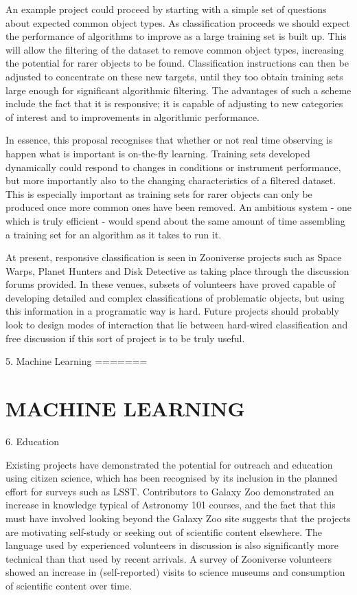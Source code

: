 \documentclass{pasa}
\begin{document}
An example project could proceed by starting with a simple set of questions about expected common object types. As classification proceeds we should expect the performance of algorithms to improve as a large training set is built up. This will allow the filtering of the dataset to remove common object types, increasing the potential for rarer objects to be found. Classification instructions can then be adjusted to concentrate on these new targets, until they too obtain training sets large enough for significant algorithmic filtering. The advantages of such a scheme include the fact that it is responsive; it is capable of adjusting to new categories of interest and to improvements in algorithmic performance. 

In essence, this proposal recognises that whether or not real time observing is happen what is important is on-the-fly learning. Training sets developed dynamically could respond to changes in conditions or instrument performance, but more importantly also to the changing characteristics of a filtered dataset. This is especially important as training sets for rarer objects can only be produced once more common ones have been removed. An ambitious system - one which is truly efficient - would spend about the same amount of time assembling a training set for an algorithm as it takes to run it. 

At present, responsive classification is seen in Zooniverse projects such as Space Warps, Planet Hunters and Disk Detective as taking place through the discussion forums provided. In these venues, subsets of volunteers have proved capable of developing detailed and complex classifications of problematic objects, but using this information in a programatic way is hard. Future projects should probably look to design modes of interaction that lie between hard-wired classification and free discussion if this sort of project is to be truly useful. 


5. Machine Learning
=======
\section{MACHINE LEARNING}
\label{sec:ml}

6. Education

Existing projects have demonstrated the potential for outreach and education using citizen science, which has been recognised by its inclusion in the planned effort for surveys such as LSST. Contributors to Galaxy Zoo demonstrated an increase in knowledge typical of Astronomy 101 courses, and the fact that this must have involved looking beyond the Galaxy Zoo site suggests that the projects are motivating self-study or seeking out of scientific content elsewhere. The language used by experienced volunteers in discussion is also significantly more technical than that used by recent arrivals. A survey of Zooniverse volunteers showed an increase in (self-reported) visits to science museums and consumption of scientific content over time. 
\end{document}

